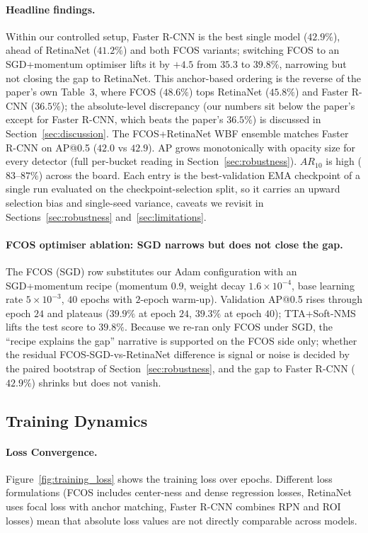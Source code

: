 \documentclass[11pt,a4paper]{article}
\begin{document}
\paragraph{Headline findings.}
Within our controlled setup, Faster R-CNN is the best single model ($42.9\%$), ahead of RetinaNet ($41.2\%$) and both FCOS variants; switching FCOS to an SGD+momentum optimiser lifts it by $+4.5$ from $35.3$ to $39.8\%$, narrowing but not closing the gap to RetinaNet. This anchor-based ordering is the reverse of the paper's own Table~3, where FCOS ($48.6\%$) tops RetinaNet ($45.8\%$) and Faster R-CNN ($36.5\%$); the absolute-level discrepancy (our numbers sit below the paper's except for Faster R-CNN, which beats the paper's $36.5\%$) is discussed in Section~\ref{sec:discussion}. The FCOS+RetinaNet WBF ensemble matches Faster R-CNN on AP@0.5 ($42.0$ vs $42.9$). AP grows monotonically with opacity size for every detector (full per-bucket reading in Section~\ref{sec:robustness}). $AR_{10}$ is high ($83$--$87\%$) across the board. Each entry is the best-validation EMA checkpoint of a single run evaluated on the checkpoint-selection split, so it carries an upward selection bias and single-seed variance, caveats we revisit in Sections~\ref{sec:robustness} and~\ref{sec:limitations}.

\paragraph{FCOS optimiser ablation: SGD narrows but does not close the gap.}
The FCOS (SGD) row substitutes our Adam configuration with an SGD+momentum recipe (momentum $0.9$, weight decay $1.6\times10^{-4}$, base learning rate $5\times10^{-3}$, $40$ epochs with $2$-epoch warm-up). Validation AP@0.5 rises through epoch $24$ and plateaus ($39.9\%$ at epoch $24$, $39.3\%$ at epoch $40$); TTA+Soft-NMS lifts the test score to $39.8\%$. Because we re-ran only FCOS under SGD, the ``recipe explains the gap'' narrative is supported on the FCOS side only; whether the residual FCOS-SGD-vs-RetinaNet difference is signal or noise is decided by the paired bootstrap of Section~\ref{sec:robustness}, and the gap to Faster R-CNN ($42.9\%$) shrinks but does not vanish.

\subsection{Training Dynamics}

\paragraph{Loss Convergence.}
Figure~\ref{fig:training_loss} shows the training loss over epochs. Different loss formulations (FCOS includes center-ness and dense regression losses, RetinaNet uses focal loss with anchor matching, Faster R-CNN combines RPN and ROI losses) mean that absolute loss values are not directly comparable across models.
\end{document}
